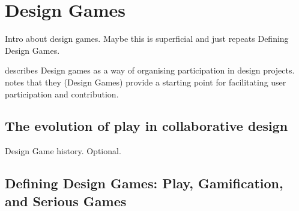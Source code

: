 \documentclass[draft,twoside]{vutinfth}
\begin{document}
\frontmatter %


\begin{danksagung*}
\end{danksagung*}

\begin{acknowledgements*}
\end{acknowledgements*}

\begin{kurzfassung}
\end{kurzfassung}

\begin{abstract}
\end{abstract}


\tableofcontents %

\mainmatter

    \chapter{Design Games}
    Intro about design games. Maybe this is superficial and just repeats Defining Design Games. 

    \cite{brandtDesigningExploratoryDesign2006} describes Design games as a way of organising participation 
    in design projects. \cite{triantafyllakosDesigningEducationalSoftware2011} notes that they (Design Games) 
    provide a starting point for facilitating user participation and contribution. 

        \section{The evolution of play in collaborative design}
        Design Game history. Optional.

        \section{Defining Design Games: Play, Gamification, and Serious Games}
        
\end{document}
